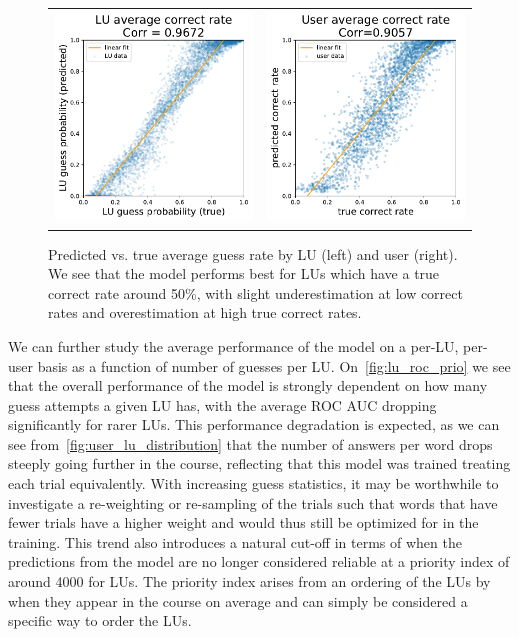 \begin{figure}[ht]
\centering
\begin{tabular}{cc}
\includegraphics[width=0.4\linewidth]{figures/lingvist/lu_correct_rate.pdf} &
\includegraphics[width=0.4\linewidth]{figures/lingvist/user_correct_rate.pdf} \\
\end{tabular}
\caption[Predicted vs. true average guess rate]{Predicted vs. true average guess rate by LU (left) and user (right). We see that the model performs best for LUs which have a true correct rate around 50\%, with slight underestimation at low correct rates and overestimation at high true correct rates.}
\label{fig:user_lu_correct_rate}
\end{figure}

We can further study the average performance of the model on a per-LU, per-user basis as a function of number of guesses per LU. On~\cref{fig:lu_roc_prio} we see that the overall performance of the model is strongly dependent on how many guess attempts a given LU has, with the average ROC AUC dropping significantly for rarer LUs. This performance degradation is expected, as we can see from~\cref{fig:user_lu_distribution} that the number of answers per word drops steeply going further in the course, reflecting that this model was trained treating each trial equivalently. With increasing guess statistics, it may be worthwhile to investigate a re-weighting or re-sampling of the trials such that words that have fewer trials have a higher weight and would thus still be optimized for in the training. This trend also introduces a natural cut-off in terms of when the predictions from the model are no longer considered reliable at a priority index of around 4000 for LUs. The priority index arises from an ordering of the LUs by when they appear in the course on average and can simply be considered a specific way to order the LUs.


